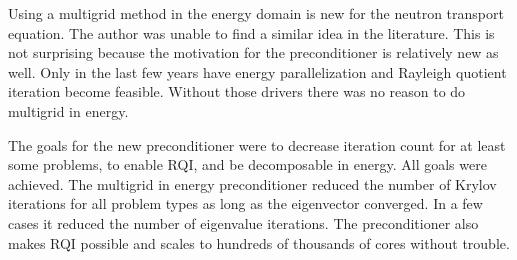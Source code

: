 Using a multigrid method in the energy domain is new for the neutron transport equation. The author was unable to find a similar idea in the literature. This is not surprising because the motivation for the preconditioner is relatively new as well. Only in the last few years have energy parallelization and Rayleigh quotient iteration become feasible. Without those drivers there was no reason to do multigrid in energy. 

The goals for the new preconditioner were to decrease iteration count for at least some problems, to enable RQI, and be decomposable in energy. All goals were achieved. The multigrid in energy preconditioner reduced the number of Krylov iterations for all problem types as long as the eigenvector converged. In a few cases it reduced the number of eigenvalue iterations. The preconditioner also makes RQI possible and scales to hundreds of thousands of cores without trouble. 












